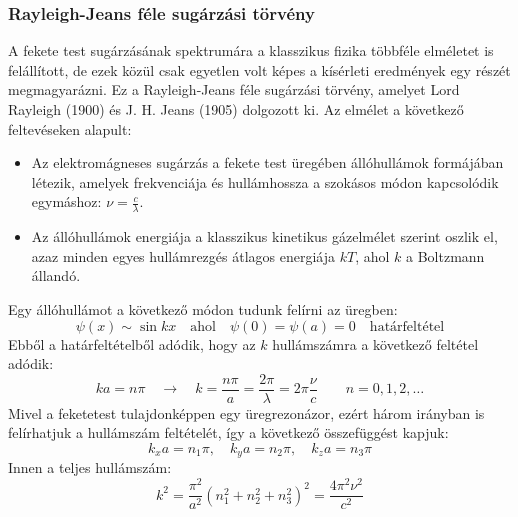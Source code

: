 \documentclass[a4paper,12pt]{article}
\begin{document}
\subsubsection{Rayleigh-Jeans féle sugárzási törvény}
A fekete test sugárzásának spektrumára a klasszikus fizika többféle elméletet is felállított, de ezek közül csak egyetlen volt képes a kísérleti eredmények egy részét megmagyarázni. Ez a Rayleigh-Jeans féle sugárzási törvény, amelyet Lord Rayleigh (1900) és J. H. Jeans (1905) dolgozott ki. Az elmélet a következő feltevéseken alapult:
\begin{itemize}
    \item Az elektromágneses sugárzás a fekete test üregében állóhullámok formájában létezik, amelyek frekvenciája és hullámhossza a szokásos módon kapcsolódik egymáshoz: $\nu = \frac{c}{\lambda}$.
    \item Az állóhullámok energiája a klasszikus kinetikus gázelmélet szerint oszlik el, azaz minden egyes hullámrezgés átlagos energiája $kT$, ahol $k$ a Boltzmann állandó.
\end{itemize}

Egy állóhullámot a következő módon tudunk felírni az üregben:
\begin{equation}
    \psi(x) \sim \sin kx \quad \text{ahol} \quad \psi(0) = \psi(a) = 0 \quad \text{határfeltétel}
\end{equation}
Ebből a határfeltételből adódik, hogy az $k$ hullámszámra a következő feltétel adódik:
\begin{equation}
    ka = n\pi \quad \rightarrow \quad k = \frac{n\pi}{a} = \frac{2 \pi}{\lambda} = 2\pi \frac{\nu}{c} \qquad n = 0, 1, 2, \ldots
\end{equation}
Mivel a feketetest tulajdonképpen egy üregrezonázor, ezért három irányban is felírhatjuk a hullámszám feltételét, így a következő összefüggést kapjuk:
\begin{equation}
    k_xa = n_1 \pi, \quad k_y a = n_2 \pi, \quad k_z a = n_3 \pi
\end{equation}
Innen a teljes hullámszám:
\begin{equation}
    k^2 = \frac{\pi^2}{a^2} (n_1^2 + n_2^2 + n_3^2)^2 = \frac{4 \pi^2 \nu^2}{c^2}
\end{equation}
\end{document}
